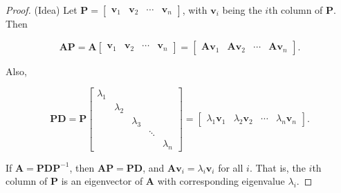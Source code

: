 \documentclass[
]{book}
\theoremstyle{definition}
\theoremstyle{definition}
\theoremstyle{definition}
\theoremstyle{definition}
\theoremstyle{remark}
\begin{document}
\begin{proof}
(Idea) Let \(\mathbf{P}=\begin{bmatrix}\mathbf{v}_1 & \mathbf{v}_2 & \cdots & \mathbf{v}_n\end{bmatrix}\), with \(\mathbf{v}_i\) being the \(i\)th column of \(\mathbf{P}.\) Then

\[\mathbf{A}\mathbf{P}=\mathbf{A}\begin{bmatrix}\mathbf{v}_1 & \mathbf{v}_2 & \cdots & \mathbf{v}_n\end{bmatrix}=\begin{bmatrix}\mathbf{A}\mathbf{v}_1 & \mathbf{A}\mathbf{v}_2 & \cdots & \mathbf{A}\mathbf{v}_n\end{bmatrix}.\]

Also,

\[\mathbf{P}\mathbf{D}=\mathbf{P}\begin{bmatrix}\lambda_1 &  &  &  & \\ & \lambda_2 &&&\\ & & \lambda_3 & &\\ &&&\ddots &\\&&&& \lambda_n\end{bmatrix}=\begin{bmatrix}\lambda_1\mathbf{v}_1 & \lambda_2\mathbf{v}_2 & \cdots & \lambda_n\mathbf{v}_n \end{bmatrix}.\]

If \(\mathbf{A}=\mathbf{P}\mathbf{D}\mathbf{P}^{-1}\), then \(\mathbf{A}\mathbf{P}=\mathbf{P}\mathbf{D}\), and \(\mathbf{A}\mathbf{v}_i=\lambda_i\mathbf{v}_i\) for all \(i\). That is, the \(i\)th column of \(\mathbf{P}\) is an eigenvector of \(\mathbf{A}\) with corresponding eigenvalue \(\lambda_i\).
\end{proof}
\end{document}
